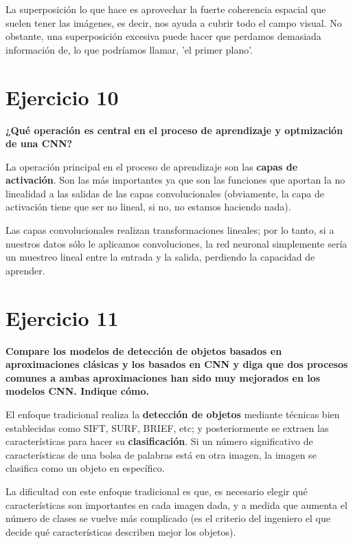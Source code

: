 \documentclass[11pt,a4paper]{article}
\begin{document}
La superposición lo que hace es aprovechar la fuerte coherencia espacial que suelen tener las imágenes, es decir, nos ayuda a cubrir todo el campo visual. No obstante,
una superposición excesiva puede hacer que perdamos demasiada información de, lo que podríamos llamar, 'el primer plano'.


\section*{Ejercicio 10}

\textbf{¿Qué operación es central en el proceso de aprendizaje y optmización de una CNN?}

La operación principal en el proceso de aprendizaje son las \textbf{capas de activación}. Son las más importantes ya que son las funciones que aportan la no linealidad
a las salidas de las capas convolucionales (obviamente, la capa de activación tiene que ser no lineal, si no, no estamos haciendo nada).

Las capas convolucionales realizan transformaciones lineales; por lo tanto, si a nuestros datos sólo le aplicamos convoluciones, la red neuronal simplemente sería un
muestreo lineal entre la entrada y la salida, perdiendo la capacidad de aprender.


\section*{Ejercicio 11}

\textbf{Compare los modelos de detección de objetos basados en aproximaciones clásicas y los basados en CNN y diga que dos procesos comunes a ambas aproximaciones han
sido muy mejorados en los modelos CNN. Indique cómo.}

El enfoque tradicional realiza la \textbf{detección de objetos} mediante técnicas bien establecidas como SIFT, SURF, BRIEF, etc; y posteriormente se extraen las
características para hacer su \textbf{clasificación}. Si un número significativo de características de una bolsa de palabras está en otra imagen, la imagen se clasifica
como un objeto en específico.

La dificultad con este enfoque tradicional es que, es necesario elegir qué características son importantes en cada imagen dada, y a medida que aumenta el número de clases
se vuelve más complicado (es el criterio del ingeniero el que decide qué características describen mejor los objetos).
\end{document}
